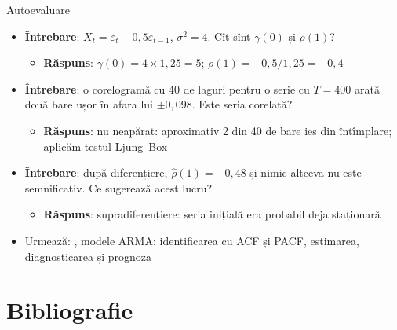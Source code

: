 \begin{frame}{Autoevaluare}
\itemsize{\small}
\begin{itemize}
    \item \textbf{Întrebare}: $X_t = \varepsilon_t - 0{,}5\varepsilon_{t-1}$, $\sigma^2 = 4$. Cît sînt $\gamma(0)$ și $\rho(1)$?
    \begin{itemize}
        \item \textbf{Răspuns}: $\gamma(0) = 4 \times 1{,}25 = 5$; $\rho(1) = -0{,}5/1{,}25 = -0{,}4$
    \end{itemize}
    \item \textbf{Întrebare}: o corelogramă cu 40 de laguri pentru o serie cu $T = 400$ arată două bare ușor în afara lui $\pm 0{,}098$. Este seria corelată?
    \begin{itemize}
        \item \textbf{Răspuns}: nu neapărat: aproximativ 2 din 40 de bare ies din întîmplare; aplicăm testul Ljung--Box
    \end{itemize}
    \item \textbf{Întrebare}: după diferențiere, $\hat\rho(1) = -0{,}48$ și nimic altceva nu este semnificativ. Ce sugerează acest lucru?
    \begin{itemize}
        \item \textbf{Răspuns}: supradiferențiere: seria inițială era probabil deja staționară
    \end{itemize}
    \item Urmează: , modele ARMA: identificarea cu ACF și PACF, estimarea, diagnosticarea și prognoza
\end{itemize}
\end{frame}


\section{Bibliografie}


